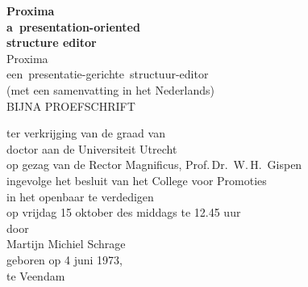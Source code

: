\newcommand{\engtitle}{Proxima\\
a~presentation-oriented\\
structure editor}

\newcommand{\nltitle}{Proxima\\
een~presentatie-gerichte~structuur-editor}

\thispagestyle{empty}

\parbox{141mm}{
\begin{center}
  {\sffamily\bfseries\Huge\engtitle\\}
  \vspace{1cm}
  {\sffamily\Large\nltitle\\}
  \vspace{1mm}
  (met een samenvatting in het Nederlands)\\
  \vspace{2cm}
  {\sffamily\Large BIJNA PROEFSCHRIFT\\}

  \vspace{0.2cm}
  
  \vspace{1cm}
  ter verkrijging van de graad van\\
  doctor aan de Universiteit Utrecht\\
  op gezag van de Rector Magnificus, Prof.\,Dr.~W.\,H.~Gispen\\
  ingevolge het besluit van het College voor Promoties\\
  in het openbaar te verdedigen\\
  op vrijdag 15 oktober des middags te 12.45 uur\\
  \vspace{1.5cm} %
  door\\
  \vspace{1.5cm} %
  {\sffamily\Large Martijn Michiel Schrage\\}
  \vspace{1cm}
  geboren op 4 juni 1973,\\
  te Veendam
\end{center}
}

\clearpage
\thispagestyle{empty}

